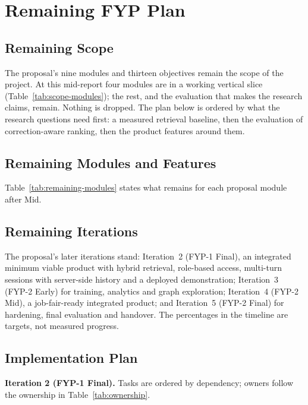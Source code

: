 \chapter{Remaining FYP Plan}

\section{Remaining Scope}

The proposal's nine modules and thirteen objectives remain the scope of the project. At this mid-report four modules are in a working vertical slice (Table~\ref{tab:scope-modules}); the rest, and the evaluation that makes the research claims, remain. Nothing is dropped. The plan below is ordered by what the research questions need first: a measured retrieval baseline, then the evaluation of correction-aware ranking, then the product features around them.

\section{Remaining Modules and Features}

Table~\ref{tab:remaining-modules} states what remains for each proposal module after Mid.



\section{Remaining Iterations}

The proposal's later iterations stand: Iteration~2 (FYP-1 Final), an integrated minimum viable product with hybrid retrieval, role-based access, multi-turn sessions with server-side history and a deployed demonstration; Iteration~3 (FYP-2 Early) for training, analytics and graph exploration; Iteration~4 (FYP-2 Mid), a job-fair-ready integrated product; and Iteration~5 (FYP-2 Final) for hardening, final evaluation and handover. The percentages in the timeline are targets, not measured progress.

\section{Implementation Plan}

\textbf{Iteration 2 (FYP-1 Final).} Tasks are ordered by dependency; owners follow the ownership in Table~\ref{tab:ownership}.

